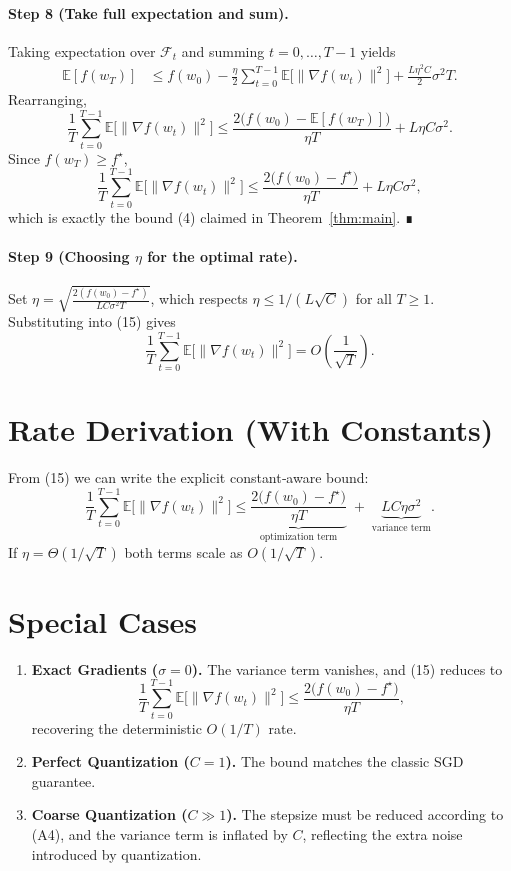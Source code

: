 \documentclass{article}
\newcommand{\E}{\mathbb{E}}
\begin{document}
\paragraph{Step 8 (Take full expectation and sum).}
Taking expectation over $\mathcal{F}_t$ and summing $t=0,\dots,T-1$ yields
\[
\begin{aligned}
\E[f(w_T)]
&\le f(w_0)-\frac{\eta}{2}\sum_{t=0}^{T-1}\E\!\big[\|\nabla f(w_t)\|^{2}\big]
   +\frac{L\eta^{2}C}{2}\sigma^{2}T.                               \tag{13}
\end{aligned}
\]
Rearranging,
\[
\frac{1}{T}\sum_{t=0}^{T-1}\E\!\big[\|\nabla f(w_t)\|^{2}\big]
\le \frac{2\big(f(w_0)-\E[f(w_T)]\big)}{\eta T}
   +L\eta C\sigma^{2}.                                            \tag{14}
\]
Since $f(w_T)\ge f^{\star}$,
\[
\frac{1}{T}\sum_{t=0}^{T-1}\E\!\big[\|\nabla f(w_t)\|^{2}\big]
\le \frac{2\big(f(w_0)-f^{\star}\big)}{\eta T}
   +L\eta C\sigma^{2},                                            \tag{15}
\]
which is exactly the bound (4) claimed in Theorem~\ref{thm:main}.  ∎

\paragraph{Step 9 (Choosing $\eta$ for the optimal rate).}
Set $\eta = \sqrt{\frac{2(f(w_0)-f^{\star})}{L C\sigma^{2}T}}$,
which respects $\eta\le 1/(L\sqrt{C})$ for all $T\ge1$.  Substituting into (15)
gives
\[
\frac{1}{T}\sum_{t=0}^{T-1}\E\!\big[\|\nabla f(w_t)\|^{2}\big]
= O\!\left(\frac{1}{\sqrt{T}}\right).
\]

\section*{Rate Derivation (With Constants)}
From (15) we can write the explicit constant‑aware bound:
\[
\boxed{
\frac{1}{T}\sum_{t=0}^{T-1}\E\!\big[\|\nabla f(w_t)\|^{2}\big]
\le
\underbrace{\frac{2\big(f(w_0)-f^{\star}\big)}{\eta T}}_{\text{optimization term}}
\;+\;
\underbrace{L C\eta\sigma^{2}}_{\text{variance term}} }.
\]
If $\eta = \Theta(1/\sqrt{T})$ both terms scale as $O(1/\sqrt{T})$.

\section*{Special Cases}
\begin{enumerate}[leftmargin=*]
\item \textbf{Exact Gradients ($\sigma=0$).}  The variance term vanishes, and (15) reduces to
\[
\frac{1}{T}\sum_{t=0}^{T-1}\E\!\big[\|\nabla f(w_t)\|^{2}\big]
\le\frac{2\big(f(w_0)-f^{\star}\big)}{\eta T},
\]
recovering the deterministic $O(1/T)$ rate.
\item \textbf{Perfect Quantization ($C=1$).}  The bound matches the classic SGD guarantee.
\item \textbf{Coarse Quantization ($C\gg1$).}  The stepsize must be reduced according
to (A4), and the variance term is inflated by $C$, reflecting the extra noise introduced by quantization.
\end{enumerate}
\end{document}
